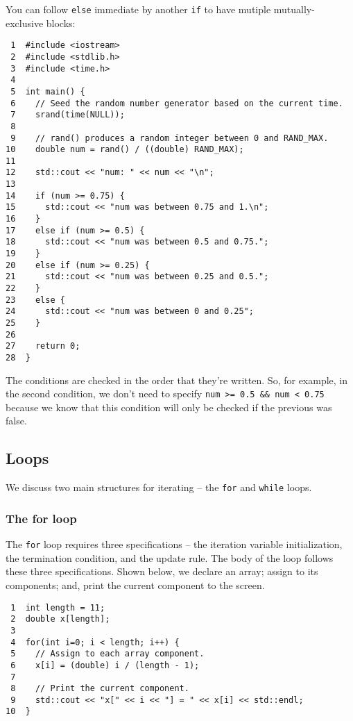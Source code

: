 \documentclass[11pt]{article}
\begin{document}
You can follow \texttt{else} immediate by another \texttt{if} to have mutiple mutually-
exclusive blocks:

\begin{verbatim}
 1  #include <iostream>
 2  #include <stdlib.h>
 3  #include <time.h>
 4  
 5  int main() {
 6    // Seed the random number generator based on the current time.
 7    srand(time(NULL));
 8  
 9    // rand() produces a random integer between 0 and RAND_MAX.
10    double num = rand() / ((double) RAND_MAX);
11  
12    std::cout << "num: " << num << "\n";
13  
14    if (num >= 0.75) {
15      std::cout << "num was between 0.75 and 1.\n";
16    }
17    else if (num >= 0.5) {
18      std::cout << "num was between 0.5 and 0.75.";
19    }
20    else if (num >= 0.25) {
21      std::cout << "num was between 0.25 and 0.5.";
22    }
23    else {
24      std::cout << "num was between 0 and 0.25";
25    }
26  
27    return 0;
28  }
\end{verbatim}

The conditions are checked in the order that they're written. So, for example,
in the second condition, we don't need to specify \verb~num >= 0.5 && num < 0.75~ 
because we know that this condition will only be checked if the previous 
was false.

\subsection{Loops}
\label{sec-4-2}
We discuss two main structures for iterating -- the \texttt{for} and \texttt{while} loops.

\subsubsection{The for loop}
\label{sec-4-2-1}
The \texttt{for} loop requires three specifications -- the iteration variable 
initialization, the termination condition, and the update rule. The body
of the loop follows these three specifications. Shown below, we declare 
an array; assign to its components; and, print the current component to 
the screen.

\begin{verbatim}
 1  int length = 11;
 2  double x[length];
 3  
 4  for(int i=0; i < length; i++) {
 5    // Assign to each array component.
 6    x[i] = (double) i / (length - 1);
 7  
 8    // Print the current component.
 9    std::cout << "x[" << i << "] = " << x[i] << std::endl;
10  }
\end{verbatim}
\end{document}
